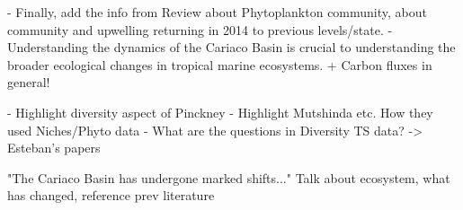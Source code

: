     
    - Finally, add the info from Review about Phytoplankton community, about community and upwelling returning in 2014 to previous levels/state.
    - Understanding the dynamics of the Cariaco Basin is crucial to understanding the broader ecological changes in tropical marine ecosystems. + Carbon fluxes in general!

    - Highlight diversity aspect of Pinckney
    - Highlight Mutshinda etc. How they used Niches/Phyto data
    - What are the questions in Diversity TS data? -> Esteban's papers
   

    
    
    "The Cariaco Basin has undergone marked shifts..." Talk about ecosystem, what has changed, reference prev literature

